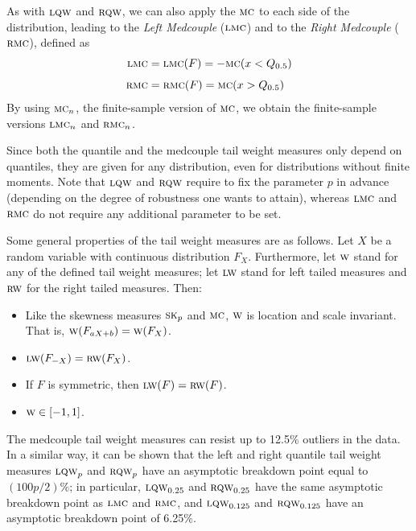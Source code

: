 As with $\stsc{LQW}$ and $\stsc{RQW}$, we can also apply the $\stsc{MC}$ to
each side of the distribution, leading to the \emph{Left Medcouple}
($\stsc{LMC}$) and to the \emph{Right Medcouple} ($\stsc{RMC}$), defined
as
%
\begin{align*}
    \stsc{LMC} &=\stsc{LMC}(F) = -\stsc{MC}(x<Q_{0.5})\\[1ex]
    \stsc{RMC} &=\stsc{RMC}(F) = \stsc{MC}(x>Q_{0.5})
\end{align*}
%
By using $\stsc{MC}_n$, the finite-sample version of $\stsc{MC}$, we
obtain the finite-sample versions $\stsc{LMC}_n$ and $\stsc{RMC}_n$.

Since both the quantile and the medcouple tail weight measures only depend on
quantiles, they are given for any distribution, even for distributions without
finite moments. Note that $\stsc{LQW}$ and $\stsc{RQW}$ require to fix the
parameter $p$ in advance (depending on the degree of robustness one wants to
attain), whereas $\stsc{LMC}$ and $\stsc{RMC}$ do not require any
additional parameter to be set.

Some general properties of the tail weight measures are as follows. 
Let $X$ be a random variable with continuous distribution $F_X$. Furthermore, 
let $\stsc{W}$ stand for any of the defined tail weight measures; 
let $\stsc{LW}$ stand for left tailed measures and $\stsc{RW}$ 
for the right tailed measures. Then:
\begin{itemize}
    \item Like the skewness measures $\stsc{SK}_p$ and $\stsc{MC}$,
    $\stsc{W}$ is location and scale invariant. That is, $\stsc{W}(F_{aX+b}) = \stsc{W}(F_X)$.

    \item $\stsc{LW}(F_{-X}) = \stsc{RW}(F_X)$.

    \item If $F$ is symmetric, then $\stsc{LW}(F) = \stsc{RW}(F)$.

    \item $\stsc{W} \in[-1,1]$.
\end{itemize}

The medcouple tail weight measures can resist up to 12.5\% outliers in the
data. In a similar way, it can be shown that the left and right quantile tail
weight measures $\stsc{LQW}_p$ and $\stsc{RQW}_p$ have an asymptotic
breakdown point equal to $(100p/2)\%$; in particular, $\stsc{LQW}_{0.25}$
and $\stsc{RQW}_{0.25}$ have the same asymptotic breakdown point as
$\stsc{LMC}$ and $\stsc{RMC}$, and $\stsc{LQW}_{0.125}$ and
$\stsc{RQW}_{0.125}$ have an asymptotic breakdown point of 6.25\%.

